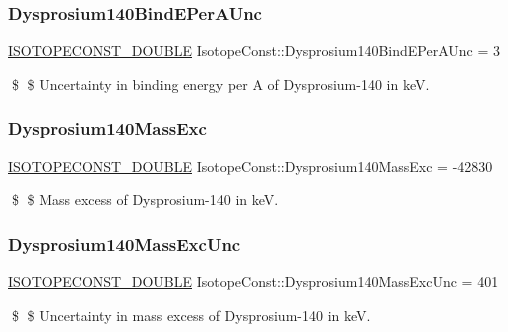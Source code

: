 \subsubsection{\texorpdfstring{Dysprosium140\+Bind\+E\+Per\+A\+Unc}{Dysprosium140BindEPerAUnc}}
{\footnotesize\ttfamily \mbox{\hyperlink{group___isotope_const-_macros_ga8f45a7272ce02c0b4c65c44636ed719a}{I\+S\+O\+T\+O\+P\+E\+C\+O\+N\+S\+T\+\_\+\+D\+O\+U\+B\+LE}} Isotope\+Const\+::\+Dysprosium140\+Bind\+E\+Per\+A\+Unc = 3}

\$ \$ Uncertainty in binding energy per A of Dysprosium-\/140 in keV. \mbox{\label{group___isotope_const-_dysprosium-_dy140_ga943e8000246e4b8196fad32450a17651}} 
\subsubsection{\texorpdfstring{Dysprosium140\+Mass\+Exc}{Dysprosium140MassExc}}
{\footnotesize\ttfamily \mbox{\hyperlink{group___isotope_const-_macros_ga8f45a7272ce02c0b4c65c44636ed719a}{I\+S\+O\+T\+O\+P\+E\+C\+O\+N\+S\+T\+\_\+\+D\+O\+U\+B\+LE}} Isotope\+Const\+::\+Dysprosium140\+Mass\+Exc = -\/42830}

\$ \$ Mass excess of Dysprosium-\/140 in keV. \mbox{\label{group___isotope_const-_dysprosium-_dy140_gafab83a6c28feb0c62f828334e67e5e27}} 
\subsubsection{\texorpdfstring{Dysprosium140\+Mass\+Exc\+Unc}{Dysprosium140MassExcUnc}}
{\footnotesize\ttfamily \mbox{\hyperlink{group___isotope_const-_macros_ga8f45a7272ce02c0b4c65c44636ed719a}{I\+S\+O\+T\+O\+P\+E\+C\+O\+N\+S\+T\+\_\+\+D\+O\+U\+B\+LE}} Isotope\+Const\+::\+Dysprosium140\+Mass\+Exc\+Unc = 401}

\$ \$ Uncertainty in mass excess of Dysprosium-\/140 in keV. \mbox{\label{group___isotope_const-_dysprosium-_dy140_gade2b53e36362949b3e98ca96929c4d63}} 
